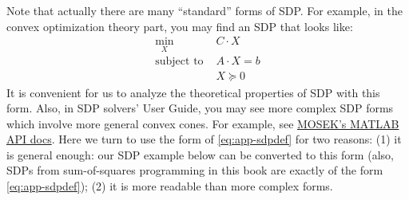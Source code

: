 \documentclass[
]{book}
\theoremstyle{definition}
\theoremstyle{definition}
\theoremstyle{definition}
\theoremstyle{definition}
\theoremstyle{remark}
\begin{document}
Note that actually there are many ``standard'' forms of SDP. For example, in the convex optimization theory part, you may find an SDP that looks like:
\begin{align}
   \min_X \ & C \cdot X \\
   \text{subject to } & A \cdot X = b \\
   & X \succeq 0
\end{align}
It is convenient for us to analyze the theoretical properties of SDP with this form. Also, in SDP solvers' User Guide, you may see more complex SDP forms which involve more general convex cones. For example, see \href{https://docs.mosek.com/10.0/toolbox/tutorial-sdo-shared.html\#doc-tutorial-sdo}{MOSEK's MATLAB API docs}. Here we turn to use the form of \eqref{eq:app-sdpdef} for two reasons: (1) it is general enough: our SDP example below can be converted to this form (also, SDPs from sum-of-squares programming in this book are exactly of the form \eqref{eq:app-sdpdef}); (2) it is more readable than more complex forms.
\end{document}
